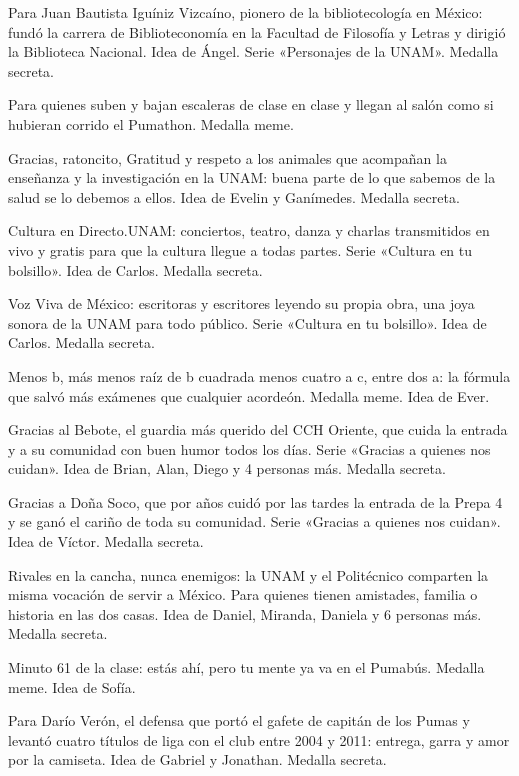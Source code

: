 \begin{description}[leftmargin=1.4cm, style=nextline]
  \item[1GU1N1Z] Para Juan Bautista Iguíniz Vizcaíno, pionero de la bibliotecología en México: fundó la carrera de Biblioteconomía en la Facultad de Filosofía y Letras y dirigió la Biblioteca Nacional. Idea de Ángel. Serie «Personajes de la UNAM». Medalla secreta.
  \item[3L3V4D0R] Para quienes suben y bajan escaleras de clase en clase y llegan al salón como si hubieran corrido el Pumathon. Medalla meme.
  \item[R4TONCITOS] Gracias, ratoncito, Gratitud y respeto a los animales que acompañan la enseñanza y la investigación en la UNAM: buena parte de lo que sabemos de la salud se lo debemos a ellos. Idea de Evelin y Ganímedes. Medalla secreta.
  \item[CULTUR4D1R] Cultura en Directo.UNAM: conciertos, teatro, danza y charlas transmitidos en vivo y gratis para que la cultura llegue a todas partes. Serie «Cultura en tu bolsillo». Idea de Carlos. Medalla secreta.
  \item[V0ZV1V4] Voz Viva de México: escritoras y escritores leyendo su propia obra, una joya sonora de la UNAM para todo público. Serie «Cultura en tu bolsillo». Idea de Carlos. Medalla secreta.
  \item[CH1CH4RR0N] Menos b, más menos raíz de b cuadrada menos cuatro a c, entre dos a: la fórmula que salvó más exámenes que cualquier acordeón. Medalla meme. Idea de Ever.
  \item[B3B0T3] Gracias al Bebote, el guardia más querido del CCH Oriente, que cuida la entrada y a su comunidad con buen humor todos los días. Serie «Gracias a quienes nos cuidan». Idea de Brian, Alan, Diego y 4 personas más. Medalla secreta.
  \item[DON4SOCO] Gracias a Doña Soco, que por años cuidó por las tardes la entrada de la Prepa 4 y se ganó el cariño de toda su comunidad. Serie «Gracias a quienes nos cuidan». Idea de Víctor. Medalla secreta.
  \item[HU3LUMG0YA] Rivales en la cancha, nunca enemigos: la UNAM y el Politécnico comparten la misma vocación de servir a México. Para quienes tienen amistades, familia o historia en las dos casas. Idea de Daniel, Miranda, Daniela y 6 personas más. Medalla secreta.
  \item[D1S0C14D0] Minuto 61 de la clase: estás ahí, pero tu mente ya va en el Pumabús. Medalla meme. Idea de Sofía.
  \item[V3R0N] Para Darío Verón, el defensa que portó el gafete de capitán de los Pumas y levantó cuatro títulos de liga con el club entre 2004 y 2011: entrega, garra y amor por la camiseta. Idea de Gabriel y Jonathan. Medalla secreta.

\end{description}
